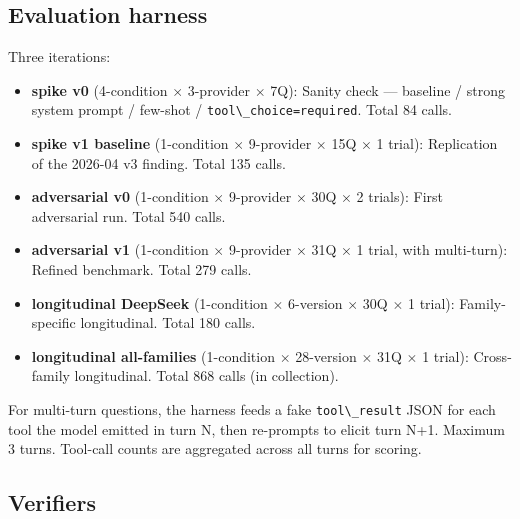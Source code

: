 \documentclass[11pt]{article}
\providecommand{\tightlist}{\setlength{\itemsep}{0pt}\setlength{\parskip}{0pt}}
\providecommand{\passthrough}[1]{#1}
\begin{document}
\subsection{Evaluation harness}\label{sec:evaluation-harness}

Three iterations:

\begin{itemize}
\tightlist
\item
  \textbf{spike v0} (4-condition $\times$ 3-provider $\times$ 7Q): Sanity check ---
  baseline / strong system prompt / few-shot /
  \passthrough{\lstinline!tool\_choice=required!}. Total 84 calls.
\item
  \textbf{spike v1 baseline} (1-condition $\times$ 9-provider $\times$ 15Q $\times$ 1 trial):
  Replication of the 2026-04 v3 finding. Total 135 calls.
\item
  \textbf{adversarial v0} (1-condition $\times$ 9-provider $\times$ 30Q $\times$ 2 trials):
  First adversarial run. Total 540 calls.
\item
  \textbf{adversarial v1} (1-condition $\times$ 9-provider $\times$ 31Q $\times$ 1 trial,
  with multi-turn): Refined benchmark. Total 279 calls.
\item
  \textbf{longitudinal DeepSeek} (1-condition $\times$ 6-version $\times$ 30Q $\times$ 1
  trial): Family-specific longitudinal. Total 180 calls.
\item
  \textbf{longitudinal all-families} (1-condition $\times$ 28-version $\times$ 31Q $\times$ 1
  trial): Cross-family longitudinal. Total 868 calls (in collection).
\end{itemize}

For multi-turn questions, the harness feeds a fake
\passthrough{\lstinline!tool\_result!} JSON for each tool the model
emitted in turn N, then re-prompts to elicit turn N+1. Maximum 3 turns.
Tool-call counts are aggregated across all turns for scoring.

\subsection{Verifiers}\label{sec:verifiers}
\end{document}
